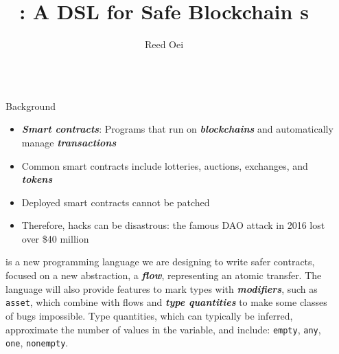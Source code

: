 \documentclass[usenames, dvipsnames, final]{beamer}
\title{\langName: A DSL for Safe Blockchain \AssetTxt{}s}
\author{Reed Oei} %
\institute[shortinst]{University of Illinois} %
\newlength{\sepwidth}
\newlength{\colwidth}
\newcommand{\separatorcolumn}{\begin{column}{\sepwidth}\end{column}}
\newcommand{\term}[1]{\textbf{\emph{#1}}}
\begin{document}
\begin{frame}[t]
\begin{columns}[t]
\separatorcolumn

\begin{column}{\colwidth}
    \begin{block}{Background}
        \begin{itemize}
            \item \term{Smart contracts}: Programs that run on \term{blockchains} and automatically manage \term{transactions}
            \item Common smart contracts include lotteries, auctions, exchanges, and \term{tokens}~\cite{OlivaEtAl2019}
            \item Deployed smart contracts cannot be patched
            \item Therefore, hacks can be disastrous: the famous DAO attack in 2016 lost over \$40 million~\cite{DAO}
        \end{itemize}

        \textcolor{softRed}{\textbf{\langName}} is a new programming language we are designing to write safer contracts, focused on a new abstraction, a \term{flow}, representing an atomic transfer.
        The \langName language will also provide features to mark types with \term{modifiers}, such as \lstinline[language=flow,basicstyle=\normalsize\ttfamily]{asset}, which combine with flows and \term{type quantities} to make some classes of bugs impossible.
        Type quantities, which can typically be inferred, approximate the number of values in the variable, and include: \lstinline[language=flow,basicstyle=\normalsize\ttfamily]{empty}, \lstinline[language=flow,basicstyle=\normalsize\ttfamily]{any}, \lstinline[language=flow,basicstyle=\normalsize\ttfamily]{one}, \lstinline[language=flow,basicstyle=\normalsize\ttfamily]{nonempty}.
    \end{block}


\end{column}
\end{columns}
\end{frame}
\end{document}
